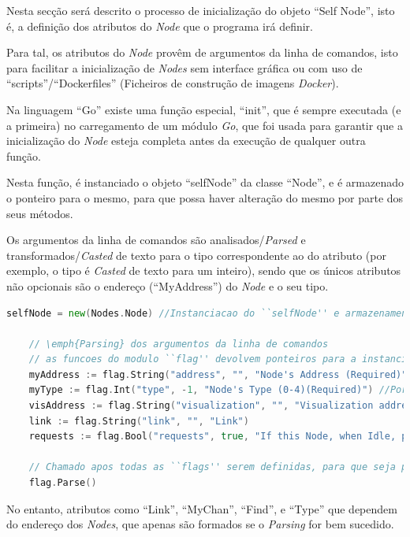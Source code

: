 Nesta secção será descrito o processo de inicialização do objeto ``Self Node'', 
isto é, a definição dos atributos do \emph{Node} que o programa irá definir.

Para tal, os atributos do \emph{Node} provêm de argumentos da linha de comandos, isto para facilitar
a inicialização de \emph{Nodes} sem interface gráfica ou com uso de ``scripts''/``Dockerfiles'' (Ficheiros de construção de imagens \emph{Docker}).

Na linguagem ``Go'' existe uma função especial, ``init'', que é sempre executada (e a primeira) no carregamento de um módulo \emph{Go},
que foi usada para garantir que a inicialização do \emph{Node} esteja completa antes da execução de qualquer outra função.



Nesta função, é instanciado o objeto ``selfNode'' da classe ``Node'', e é armazenado o ponteiro para o mesmo, para que possa haver alteração do mesmo
por parte dos seus métodos.

Os argumentos da linha de comandos são analisados/\emph{Parsed} e transformados/\emph{Casted} de texto para o tipo
correspondente ao do atributo (por exemplo, o tipo é \emph{Casted} de texto para um inteiro), sendo que 
os únicos atributos não opcionais são o endereço (``MyAddress'') do \emph{Node} e o seu tipo.


\begin{lstlisting}[caption={\emph{Parsing} dos argumentos da linha de comandos.},language=Go]
	selfNode = new(Nodes.Node) //Instanciacao do ``selfNode'' e armazenamento do ponteiro para o mesmo

	// \emph{Parsing} dos argumentos da linha de comandos
	// as funcoes do modulo ``flag'' devolvem ponteiros para a instanciacao de cada argumento \emph{Parsed}
	myAddress := flag.String("address", "", "Node's Address (Required)")
	myType := flag.Int("type", -1, "Node's Type (0-4)(Required)") //Por definicao de todos os tipos
	visAddress := flag.String("visualization", "", "Visualization address.")
	link := flag.String("link", "", "Link")
	requests := flag.Bool("requests", true, "If this Node, when Idle, preforms Object Requests")

	// Chamado apos todas as ``flags'' serem definidas, para que seja processado o \emph{Parsing}
	flag.Parse()

\end{lstlisting}

No entanto, atributos como ``Link'', ``MyChan'', ``Find'', e ``Type'' que dependem do endereço dos \emph{Nodes},
que apenas são formados se o \emph{Parsing} for bem sucedido.

